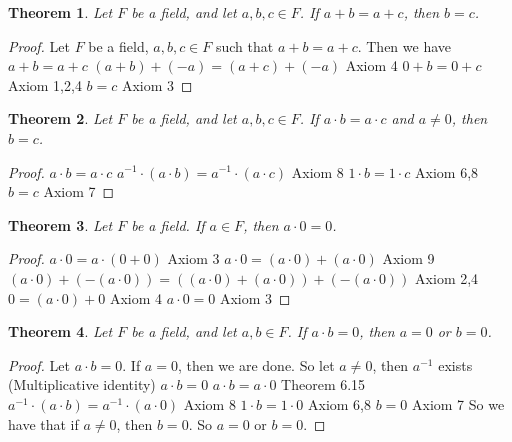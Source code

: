 \documentclass[12pt]{article}
\renewcommand{\_}[1]{\underline{ #1 }}
\newtheorem{theorem}{Theorem}[section]
\theoremstyle{definition}
\numberwithin{equation}{subsection}
\begin{document}
\begin{theorem}
Let $F$ be a field, and let $a,b,c\in F$.  If $a+b=a+c$, then $b=c$.
\end{theorem}

\begin{proof}
Let $F$ be a field, $a,b,c \in F$ such that $a + b = a + c$. Then we have \newline
$a + b = a + c$ \newline
$(a + b) + (-a) = (a + c) + (-a)$ Axiom 4 \newline 
$0 + b = 0 + c$ Axiom 1,2,4 \newline 
$b = c$ Axiom 3
\end{proof}

\begin{theorem}
Let $F$ be a field, and let $a,b,c\in F$.  If $a\cdot b=a\cdot c$ and $a\neq 0$, then $b=c$.
\end{theorem}

\begin{proof}
$a \cdot b = a \cdot c$ \newline
$a^{-1} \cdot (a \cdot b) = a^{-1} \cdot (a \cdot c)$ Axiom 8 \newline
$1 \cdot b = 1 \cdot c$ Axiom 6,8 \newline
$b = c$ Axiom 7
\end{proof}

\begin{theorem}
Let $F$ be a field.  If $a\in F$, then $a\cdot 0 =0$.
\end{theorem}

\begin{proof}
$a \cdot 0 = a \cdot (0 + 0)$ Axiom 3 \newline
$a \cdot 0 = (a \cdot 0) + (a \cdot 0)$ Axiom 9 \newline
$(a \cdot 0) + (-(a \cdot 0)) = ((a \cdot 0) + (a \cdot 0)) + (-(a \cdot 0))$ Axiom 2,4 \newline
$0 = (a \cdot 0) + 0$ Axiom 4 \newline
$a \cdot 0 = 0$ Axiom 3
\end{proof}

\begin{theorem}
Let $F$ be a field, and let $a, b\in F$.  If $a\cdot b=0$, then $a=0$ or $b=0$.
\end{theorem}

\begin{proof}
Let $a \cdot b = 0$. If $a = 0$, then we are done. So let $a \not = 0$, then $a^{-1}$ exists (Multiplicative identity) \newline
$a \cdot b = 0$ \newline
$a \cdot b = a \cdot 0$ Theorem 6.15 \newline
$a^{-1} \cdot (a \cdot b) = a^{-1} \cdot (a \cdot 0)$ Axiom 8 \newline
$1 \cdot b = 1 \cdot 0$ Axiom 6,8 \newline
$b = 0$ Axiom 7 \newline
So we have that if $a \not = 0$, then $b = 0$. So $a = 0$ or $b = 0$.
\end{proof}
\end{document}
